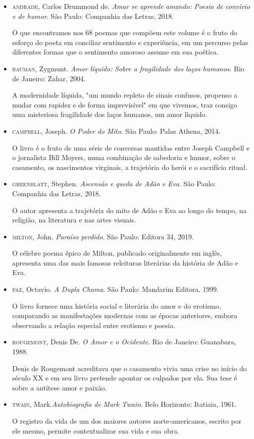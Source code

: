 \documentclass[12pt]{extarticle}
\begin{document}
\begin{itemize}

\item\textsc{andrade}, Carlos Drummond de. \textit{Amar se aprende amando: Poesia de
convívio e de humor}. São Paulo: Companhia das Letras, 2018.

O que encontramos nos 68 poemas que compõem este volume é o fruto do
esforço do poeta em conciliar sentimento e experiência, em um percurso
pelas diferentes formas que o sentimento amoroso assume em sua poética.


\item\textsc{bauman}, Zygmunt. \textit{Amor líquido: Sobre a fragilidade dos laços
humanos}. Rio de Janeiro: Zahar, 2004. 

A modernidade líquida, "um mundo repleto de sinais confusos, propenso a
mudar com rapidez e de forma imprevisível" em que vivemos, traz consigo
uma misteriosa fragilidade dos laços humanos, um amor líquido.

\item\textsc{campbell}, Joseph. \textit{O Poder do Mito}. São Paulo: Palas Athena,
2014.

O livro é o fruto de uma série de conversas mantidas entre Joseph
Campbell e o jornalista Bill Moyers, numa combinação de sabedoria e
humor, sobre o casamento, os nascimentos virginais, a trajetória do
herói e o sacrifício ritual.

\item\textsc{greenblatt}, Stephen. \textit{Ascensão e queda de Adão e Eva}. São Paulo: Companhia das Letras, 2018.

O autor apresenta a trajetória do mito de Adão e Eva ao longo do tempo,
na religião, na literatura e nas artes visuais.

\item\textsc{milton}, John. \textit{Paraíso perdido}. São Paulo: Editora 34, 2019.

O célebre poema épico de Milton, publicado originalmente em inglês,
apresenta uma das mais famosas releituras literárias da história de Adão
e Eva.

\item\textsc{paz}, Octavio. \textit{A Dupla Chama}. São Paulo: Mandarim Editora, 1999.

O livro fornece uma história social e literária do amor e do erotismo,
comparando as manifestações modernas com as épocas anteriores, embora
observando a relação especial entre erotismo e poesia.

\item\textsc{rougemont}, Denis De. \textit{O Amor e o Ocidente}. Rio de Janeiro:
Guanabara, 1988.

Denis de Rougemont acreditava que o casamento vivia uma crise no início
do século XX e em seu livro pretende apontar os culpados por ela. Sua
tese é sobre a antítese amor e paixão.

\item\textsc{twain}, Mark.\textit{Autobiografia de Mark Twain}. Belo Horizonte:
Itatiaia, 1961.

O registro da vida de um dos maiores autores norte-americanos, escrito
por ele mesmo, permite contextualizar sua vida e sua obra.


\end{itemize}
\end{document}
